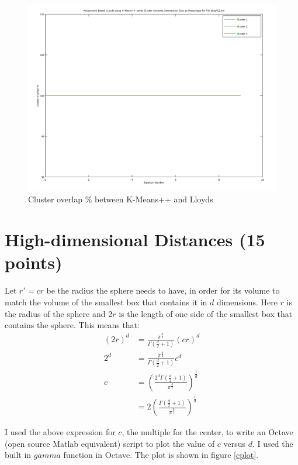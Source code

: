 \documentclass[11pt]{article}
\begin{document}
\begin{figure}[!htb]
\centering
\includegraphics[width=5in]{figures/2BOverlap.png}
\caption{Cluster overlap \% between K-Means++ and Lloyds}
\label{2BOverlap}
\end{figure}

\section{High-dimensional Distances (15 points)}

Let $r'=cr$ be the radius the sphere needs to have, in order for its volume to match the volume of the smallest box that contains it in $d$ dimensions. Here $r$ is the radius of the sphere and $2r$ is the length of one side of the smallest box that contains the sphere. This means that:\\

\begin{equation*}
\begin{aligned}
(2r)^d &= \frac{\pi^{\frac{d}{2}}}{\Gamma \left (\frac{d}{2} +1 \right )} (cr)^d  \\
2^d &= \frac{\pi^{\frac{d}{2}}}{\Gamma \left (\frac{d}{2} +1 \right )} c^d  \\
c &= \left ( \frac{2^d \Gamma \left ( \frac{d}{2} + 1 \right )}{\pi ^ \frac{d}{2}} \right ) ^ \frac{1}{d}\\
&= 2 \left ( \frac{ \Gamma \left ( \frac{d}{2} + 1 \right )}{\pi ^ \frac{d}{2}} \right ) ^ \frac{1}{d}
\end{aligned}
\end{equation*}

I used the above expression for $c$, the multiple for the center, to write an Octave (open source Matlab equivalent) script to plot the value of $c$ versus $d$. I used the built in $gamma$ function in Octave. The plot is shown in figure \ref{cplot}.
\end{document}
